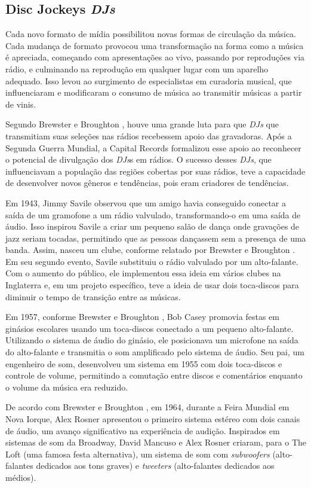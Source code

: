\subsection{Disc Jockeys \textit{DJs}}

Cada novo formato de mídia possibilitou novas formas de circulação da música. Cada mudança de formato provocou uma transformação na forma como a música é apreciada, começando com apresentações ao vivo, passando por reproduções via rádio, e culminando na reprodução em qualquer lugar com um aparelho adequado. Isso levou ao surgimento de especialistas em curadoria musical, que influenciaram e modificaram o consumo de música ao transmitir músicas a partir de vinis.

Segundo Brewster e Broughton \cite{lastnight}, houve uma grande luta para que \textit{DJs} que transmitiam suas seleções nas rádios recebessem apoio das gravadoras. Após a Segunda Guerra Mundial, a Capital Records formalizou esse apoio ao reconhecer o potencial de divulgação dos \textit{DJs}s em rádios. O sucesso desses \textit{DJs}, que influenciavam a população das regiões cobertas por suas rádios, teve a capacidade de desenvolver novos gêneros e tendências, pois eram criadores de tendências.

Em 1943, Jimmy Savile observou que um amigo havia conseguido conectar a saída de um gramofone a um rádio valvulado, transformando-o em uma saída de áudio. Isso inspirou Savile a criar um pequeno salão de dança onde gravações de jazz seriam tocadas, permitindo que as pessoas dançassem sem a presença de uma banda. Assim, nasceu um clube, conforme relatado por Brewster e Broughton \cite{lastnight}. Em seu segundo evento, Savile substituiu o rádio valvulado por um alto-falante. Com o aumento do público, ele implementou essa ideia em vários clubes na Inglaterra e, em um projeto específico, teve a ideia de usar dois toca-discos para diminuir o tempo de transição entre as músicas.

Em 1957, conforme Brewster e Broughton \cite{lastnight}, Bob Casey promovia festas em ginásios escolares usando um toca-discos conectado a um pequeno alto-falante. Utilizando o sistema de áudio do ginásio, ele posicionava um microfone na saída do alto-falante e transmitia o som amplificado pelo sistema de áudio. Seu pai, um engenheiro de som, desenvolveu um sistema em 1955 com dois toca-discos e controle de volume, permitindo a comutação entre discos e comentários enquanto o volume da música era reduzido.

De acordo com Brewster e Broughton \cite{lastnight}, em 1964, durante a Feira Mundial em Nova Iorque, Alex Rosner apresentou o primeiro sistema estéreo com dois canais de áudio, um avanço significativo na experiência de audição. Inspirados em sistemas de som da Broadway, David Mancuso e Alex Rosner criaram, para o The Loft (uma famosa festa alternativa), um sistema de som com \textit{subwoofers} (alto-falantes dedicados aos tons graves) e \textit{tweeters} (alto-falantes dedicados aos médios).

